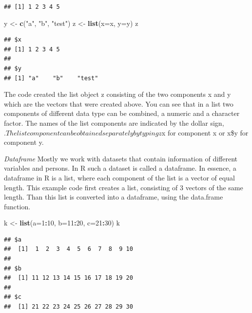 \documentclass[]{book}
\newenvironment{Shaded}{\begin{snugshade}}{\end{snugshade}}
\newcommand{\KeywordTok}[1]{\textcolor[rgb]{0.13,0.29,0.53}{\textbf{#1}}}
\newcommand{\DataTypeTok}[1]{\textcolor[rgb]{0.13,0.29,0.53}{#1}}
\newcommand{\DecValTok}[1]{\textcolor[rgb]{0.00,0.00,0.81}{#1}}
\newcommand{\StringTok}[1]{\textcolor[rgb]{0.31,0.60,0.02}{#1}}
\newcommand{\OperatorTok}[1]{\textcolor[rgb]{0.81,0.36,0.00}{\textbf{#1}}}
\newcommand{\NormalTok}[1]{#1}
\theoremstyle{definition}
\theoremstyle{definition}
\theoremstyle{definition}
\theoremstyle{remark}
\begin{document}
\begin{verbatim}
## [1] 1 2 3 4 5
\end{verbatim}

\begin{Shaded}
\begin{Highlighting}[]
\NormalTok{y <-}\StringTok{ }\KeywordTok{c}\NormalTok{(}\StringTok{"a"}\NormalTok{, }\StringTok{"b"}\NormalTok{, }\StringTok{"test"}\NormalTok{)}
\NormalTok{z <-}\StringTok{ }\KeywordTok{list}\NormalTok{(}\DataTypeTok{x=}\NormalTok{x, }\DataTypeTok{y=}\NormalTok{y)}
\NormalTok{z}
\end{Highlighting}
\end{Shaded}

\begin{verbatim}
## $x
## [1] 1 2 3 4 5
## 
## $y
## [1] "a"    "b"    "test"
\end{verbatim}

The code created the list object z consisting of the two components x
and y which are the vectors that were created above. You can see that in
a list two components of different data type can be combined, a numeric
and a character factor. The names of the list components are indicated
by the dollar sign,
\(. The list component can be obtained separately by typing z\)x for
component x or x\$y for component y.

\emph{Dataframe} Mostly we work with datasets that contain information
of different variables and persons. In R such a dataset is called a
dataframe. In essence, a dataframe in R is a list, where each component
of the list is a vector of equal length. This example code first creates
a list, consisting of 3 vectors of the same length. Than this list is
converted into a dataframe, using the data.frame function.

\begin{Shaded}
\begin{Highlighting}[]
\NormalTok{k <-}\StringTok{ }\KeywordTok{list}\NormalTok{(}\DataTypeTok{a=}\DecValTok{1}\OperatorTok{:}\DecValTok{10}\NormalTok{, }\DataTypeTok{b=}\DecValTok{11}\OperatorTok{:}\DecValTok{20}\NormalTok{, }\DataTypeTok{c=}\DecValTok{21}\OperatorTok{:}\DecValTok{30}\NormalTok{)}
\NormalTok{k}
\end{Highlighting}
\end{Shaded}

\begin{verbatim}
## $a
##  [1]  1  2  3  4  5  6  7  8  9 10
## 
## $b
##  [1] 11 12 13 14 15 16 17 18 19 20
## 
## $c
##  [1] 21 22 23 24 25 26 27 28 29 30
\end{verbatim}
\end{document}
